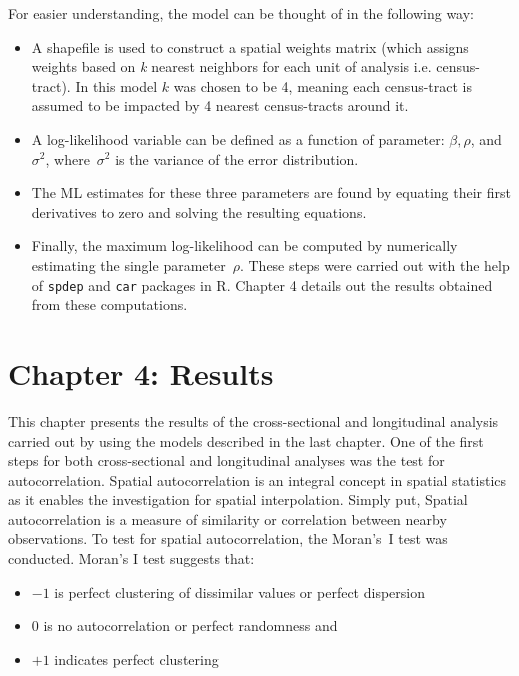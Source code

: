 \documentclass[10pt,letterpaper,onecolumn]{article}
\begin{document}
For easier understanding, the model can be thought of in the following
way:
\begin{itemize}
\item
A shapefile is used to construct a spatial weights matrix (which
assigns weights based on \emph{k} nearest neighbors for each unit of
analysis i.e. census-tract). In this model \(k\) was chosen to be 4,
meaning each census-tract is assumed to be impacted by 4 nearest
census-tracts around it.
\item
A log-likelihood variable can be defined as a function of parameter:
\(\beta, \rho\), and \(\sigma^2\), where~\(\sigma^2\) is the variance of the error distribution.
\item
The ML estimates for these three parameters are found by equating
their first derivatives to zero and solving the resulting equations.
\item
Finally, the maximum log-likelihood can be computed by numerically
estimating the single parameter~\(\rho\).
These steps were carried out with the help of \texttt{spdep} and \texttt{car} packages in R.
Chapter 4 details out the results obtained from these computations.
\end{itemize}





\section*{Chapter 4: Results}\label{sec: results}


This chapter presents the results of the cross-sectional and
longitudinal analysis carried out by using the models described in the
last chapter. One of the first steps for both cross-sectional and
longitudinal analyses was the test for autocorrelation. Spatial
autocorrelation is an integral concept in spatial statistics as it
enables the investigation for spatial interpolation. Simply put, Spatial
autocorrelation is a measure of similarity or correlation between nearby
observations. To test for spatial autocorrelation, the Moran's~I test
was conducted. Moran's I test suggests that:

\begin{itemize}
\item \(-1\) is perfect clustering of dissimilar values or perfect dispersion
\item \(0\) is no autocorrelation or perfect randomness and
\item \(+1\) indicates perfect clustering
\end{itemize}
\end{document}

